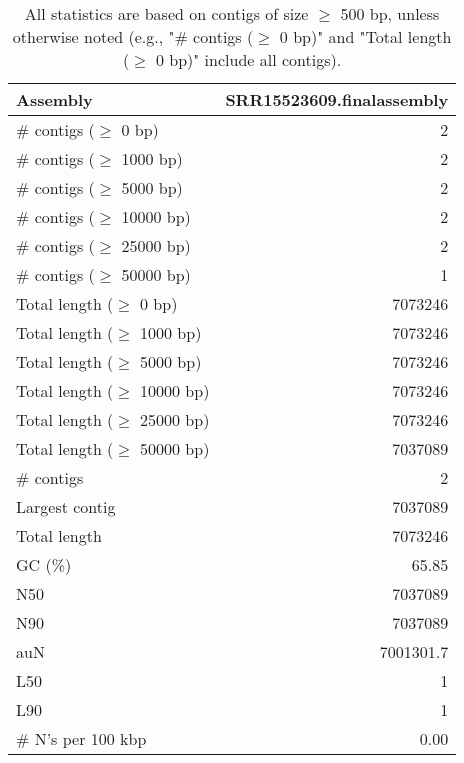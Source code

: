 \documentclass[12pt,a4paper]{article}
\begin{document}
\begin{table}[ht]
\begin{center}
\caption{All statistics are based on contigs of size $\geq$ 500 bp, unless otherwise noted (e.g., "\# contigs ($\geq$ 0 bp)" and "Total length ($\geq$ 0 bp)" include all contigs).}
\begin{tabular}{|l*{1}{|r}|}
\hline
Assembly & SRR15523609.finalassembly \\ \hline
\# contigs ($\geq$ 0 bp) & 2 \\ \hline
\# contigs ($\geq$ 1000 bp) & 2 \\ \hline
\# contigs ($\geq$ 5000 bp) & 2 \\ \hline
\# contigs ($\geq$ 10000 bp) & 2 \\ \hline
\# contigs ($\geq$ 25000 bp) & 2 \\ \hline
\# contigs ($\geq$ 50000 bp) & 1 \\ \hline
Total length ($\geq$ 0 bp) & 7073246 \\ \hline
Total length ($\geq$ 1000 bp) & 7073246 \\ \hline
Total length ($\geq$ 5000 bp) & 7073246 \\ \hline
Total length ($\geq$ 10000 bp) & 7073246 \\ \hline
Total length ($\geq$ 25000 bp) & 7073246 \\ \hline
Total length ($\geq$ 50000 bp) & 7037089 \\ \hline
\# contigs & 2 \\ \hline
Largest contig & 7037089 \\ \hline
Total length & 7073246 \\ \hline
GC (\%) & 65.85 \\ \hline
N50 & 7037089 \\ \hline
N90 & 7037089 \\ \hline
auN & 7001301.7 \\ \hline
L50 & 1 \\ \hline
L90 & 1 \\ \hline
\# N's per 100 kbp & 0.00 \\ \hline
\end{tabular}
\end{center}
\end{table}
\end{document}
